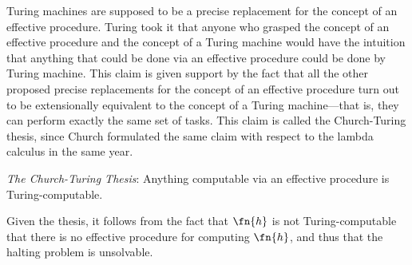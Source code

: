 \documentclass[../../include/open-logic-section]{subfiles}
\begin{document}

Turing machines are supposed to be a precise replacement for the concept of
an effective procedure. Turing took it that anyone who grasped the concept
of an effective procedure and the concept of a Turing machine would have
the intuition that anything that could be done via an effective procedure
could be done by Turing machine. This claim is given support by the fact
that all the other proposed precise replacements for the concept of an
effective procedure turn out to be extensionally equivalent to the concept
of a Turing machine---that is, they can perform exactly the same set of
tasks. This claim is called the Church-Turing thesis, since Church
formulated the same claim with respect to the lambda calculus in the same
year.

\begin{defn}
\emph{The Church-Turing Thesis}: Anything computable via an effective
procedure is Turing-computable.
\end{defn}

Given the thesis, it follows from the fact that $\fn{h}$ is not
Turing-computable that there is no effective procedure for computing
$\fn{h}$, and thus that the halting problem is unsolvable.
\end{document}

